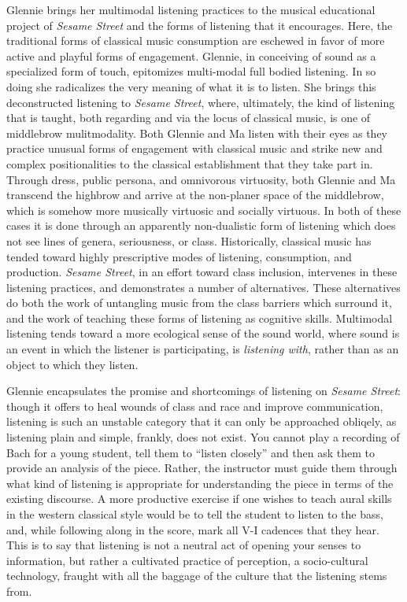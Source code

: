 \documentclass[12pt,letterpaper]{article}
\begin{document}
	Glennie brings her multimodal listening practices to the musical 
	educational project of \textit{Sesame Street} and the forms of
	listening that it encourages. Here, the traditional forms of classical
	music consumption are eschewed in favor of more active and playful 
	forms of engagement. Glennie, in conceiving of sound as a specialized 
	form of touch, epitomizes multi-modal full bodied listening. In so doing
	she radicalizes the very meaning of what it is to listen. She brings 
	this deconstructed listening to \textit{Sesame Street}, where, 
	ultimately, the kind of listening that is  
	taught, both regarding and via the locus of classical music, is one 
	of middlebrow  mulitmodality. Both Glennie and Ma listen with their eyes
	as they practice unusual forms of engagement with classical music 
	and strike new and complex positionalities to the classical 
	establishment that they take part in. Through dress, public persona, and
	omnivorous virtuosity, both Glennie
	and Ma transcend the highbrow and arrive at the non-planer space of the 
	middlebrow, which is somehow more musically virtuosic and socially 
	virtuous. In both of these cases it is done through an apparently  
	non-dualistic form of listening which does not see lines of genera, 
	seriousness, or class. Historically, classical music has tended toward
	highly prescriptive modes of listening, consumption, and production. 
	\textit{Sesame Street}, in an effort toward class inclusion, intervenes
	in these listening practices, and demonstrates a number of alternatives.
	These alternatives do both the work of untangling music from the class
	barriers which surround it, and the work of teaching these forms of
	listening as cognitive skills. Multimodal listening tends toward a more 
	ecological sense of the sound world, where sound is an event in which 
	the listener is participating, is \textit{listening with}, rather than 
	as an object to which they listen.\autocite[109]{Ceraso}

	Glennie encapsulates the promise and shortcomings of listening on 
	\textit{Sesame Street}: though it offers to heal wounds of class and 
	race and improve communication, listening is such an unstable category 
	that it can only be approached obliqely, as listening plain and simple,
	frankly, does not exist. You cannot play a recording of Bach for a young
	student, tell them to ``listen closely'' and then ask them to provide an
	analysis of the piece. Rather, the instructor must guide them through 
	what kind of listening is appropriate for understanding the piece in 
	terms of the existing discourse. A more productive exercise if one 
	wishes to teach aural skills in the western classical style would be to 
	tell the student to listen to the bass, and, while following along in 
	the score, mark all V-I cadences that they hear. This is to say that 
	listening is not a neutral act of opening your senses to information, 
	but rather a cultivated practice of perception, a socio-cultural 
	technology, fraught with all the baggage of the culture that the 
	listening stems from. 
\end{document}
